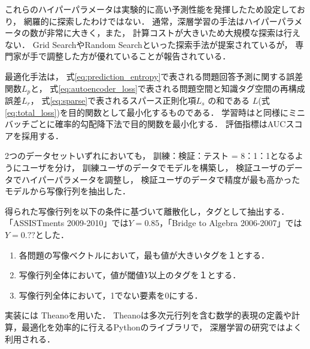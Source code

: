 これらのハイパーパラメータは実験的に高い予測性能を発揮したため設定しており，
網羅的に探索したわけではない．
通常，深層学習の手法はハイパーパラメータの数が非常に大きく，また，
計算コストが大きいため大規模な探索は行えない．
Grid SearchやRandom Search\cite{bergstra2012random}といった探索手法が提案されているが，
専門家が手で調整した方が優れていることが報告されている\cite{larochelle2007empirical, bergstra2012random}．

最適化手法は，
式\ref{eq:prediction_entropy}で表される問題回答予測に関する誤差関数$L_p$と，
式\ref{eq:autoencoder_loss}で表される問題空間と知識タグ空間の再構成誤差$L_r$，
式\ref{eq:sparse}で表されるスパース正則化項$L_s$
の和である
$L$(式\ref{eq:total_loss})を目的関数として最小化するものである．
学習時は\cite{piech2015deep}と同様にミニバッチごとに確率的勾配降下法で目的関数を最小化する．
評価指標はAUCスコアを採用する．

2つのデータセットいずれにおいても，
訓練：検証：テスト = 8：1：1となるようにユーザを分け，
訓練ユーザのデータでモデルを構築し，
検証ユーザのデータでハイパーパラメータを調整し， 
検証ユーザのデータで精度が最も高かったモデルから写像行列を抽出した．


得られた写像行列を以下の条件に基づいて離散化し，タグとして抽出する．
「ASSISTments 2009-2010」では$Y = 0.85$，「Bridge to Algebra 2006-2007」では$Y = 0.??$とした．
\begin{enumerate}
\item 各問題の写像ベクトルにおいて，最も値が大きいタグを１とする．
\item 写像行列全体において，値が閾値$Y$以上のタグを１とする．
\item 写像行列全体において，1でない要素を0にする．
\end{enumerate}

実装には
Theano\cite{bergstra+al:2010-scipy,Bastien-Theano-2012}を用いた．
Theanoは多次元行列を含む数学的表現の定義や計算，最適化を効率的に行えるPythonのライブラリで，
深層学習の研究ではよく利用される．


